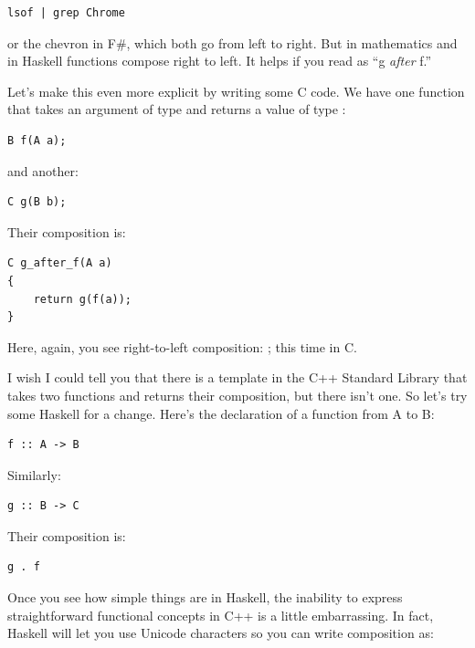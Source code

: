 \begin{Verbatim}[commandchars=\\\{\}]
lsof | grep Chrome
\end{Verbatim}
or the chevron \code{>>} in F\#, which both
go from left to right. But in mathematics and in Haskell functions
compose right to left. It helps if you read  as ``g \emph{after} f.''

Let's make this even more explicit by writing some C code. We have one
function  that takes an argument of type  and
returns a value of type :

\begin{Verbatim}[commandchars=\\\{\}]
B f(A a);
\end{Verbatim}
and another:

\begin{Verbatim}[commandchars=\\\{\}]
C g(B b);
\end{Verbatim}
Their composition is:

\begin{Verbatim}
C g_after_f(A a)
{
    return g(f(a));
}
\end{Verbatim}
Here, again, you see right-to-left composition: ; this
time in C.

I wish I could tell you that there is a template in the C++ Standard
Library that takes two functions and returns their composition, but
there isn't one. So let's try some Haskell for a change. Here's the
declaration of a function from A to B:

\begin{Verbatim}[commandchars=\\\{\}]
f :: A -> B
\end{Verbatim}
Similarly:

\begin{Verbatim}[commandchars=\\\{\}]
g :: B -> C
\end{Verbatim}
Their composition is:

\begin{Verbatim}[commandchars=\\\{\}]
g . f
\end{Verbatim}
Once you see how simple things are in Haskell, the inability to express
straightforward functional concepts in C++ is a little embarrassing. In
fact, Haskell will let you use Unicode characters so you can write
composition as:

